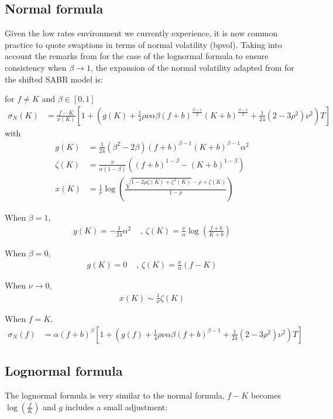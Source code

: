 \documentclass[]{rAMF2e}
\begin{document}
\subsection{Normal formula}
Given the low rates environment we currently experience, it is now common practice to quote swaptions in terms of normal volatility (bpvol). Taking into account the remarks from \citet{obloj2008fine} for the case of the lognormal formula to ensure consistency when $\beta \to 1$, the expansion of the normal volatility adapted from \citet{hagan2002managing} for the shifted SABR model is:

for $f \neq K$ and $\beta \in [0,1]$
\begin{align}
\label{eqn:normal_sabr}
\sigma_N(K) &= \frac{f-K}{x(K)}\left[1+\left(g(K)+\frac{1}{4}\rho\nu\alpha\beta(f+b)^{\frac{\beta-1}{2}}(K+b)^{\frac{\beta-1}{2}}+\frac{1}{24}(2-3\rho^2)\nu^2\right)T\right]
\end{align}
with 
\begin{align*}
g(K) &= \frac{1}{24} (\beta^2-2\beta) (f+b)^{\beta-1} (K+b)^{\beta-1} \alpha^2\\
\zeta(K) &= \frac{\nu}{\alpha (1-\beta)} \left( (f+b)^{1-\beta} - (K+b)^{1-\beta} \right)\\
x(K) &= \frac{1}{\nu}\log\left(\frac{\sqrt{1-2\rho\zeta(K)+\zeta^2(K)}-\rho+\zeta(K)}{1-\rho} \right)
\end{align*}

When $\beta = 1$,
\begin{align*}
g(K) = -\frac{1}{24}\alpha^2 &\texttt{ , } \zeta(K) = \frac{\nu}{\alpha} \log\left(\frac{f+b}{K+b}\right)
\end{align*}

When $\beta = 0$,
\begin{align*}
g(K) = 0 &\texttt{ , }\zeta(K) = \frac{\nu}{\alpha} \left(f-K\right)
\end{align*}


When $\nu \to 0$,
\begin{align*}
x(K) \sim \frac{1}{\nu}\zeta(K)
\end{align*}

When $f=K$, 
\begin{align}
\sigma_N(f) &= \alpha (f+b)^\beta \left[1+\left(g(f)+\frac{1}{4}\rho\nu\alpha\beta(f+b)^{\beta-1}+\frac{1}{24}(2-3\rho^2)\nu^2\right)T\right]
\end{align}


\subsection{Lognormal formula}
The lognormal formula is very similar to the normal formula, $f-K$ becomes $\log(\frac{f}{K})$ and $g$ includes a small adjustment:
\end{document}
